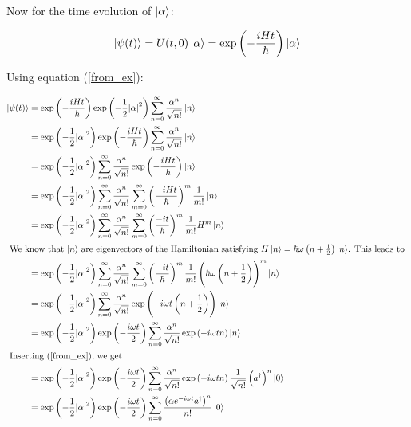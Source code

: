 \documentclass[a4paper,german,12pt,smallheadings]{scrartcl}
\begin{document}
\begin{enumerate}[a)]
    Now for the time evolution of $\ket{\alpha}$:

    \begin{equation*}
      \ket{\psi(t)} = U(t,0) \ket{\alpha} = \exp\del{-\frac{i H t}{\hbar}} \ket{\alpha}
    \end{equation*}

    Using equation (\ref{from_ex}):

    \begin{align*}
      \ket{\psi(t)} &= \exp\del{-\frac{i H t}{\hbar}} \exp\del{-\frac{1}{2} \envert{\alpha}^2} \sum_{n=0}^\infty \frac{\alpha^n}{\sqrt{n!}} \ket{n} \\
      &= \exp\del{-\frac{1}{2}  \envert{\alpha}^2} \exp\del{-\frac{i H t}{\hbar}} \sum_{n=0}^\infty \frac{\alpha^n}{\sqrt{n!}} \ket{n} \\
      &= \exp\del{-\frac{1}{2}  \envert{\alpha}^2}  \sum_{n=0}^\infty \frac{\alpha^n}{\sqrt{n!}} \exp\del{-\frac{i H t}{\hbar}} \ket{n} \\
      &= \exp\del{-\frac{1}{2}  \envert{\alpha}^2}  \sum_{n=0}^\infty \frac{\alpha^n}{\sqrt{n!}} \sum_{m=0}^\infty \del{\frac{-iHt}{\hbar}}^m \frac{1}{m!} \ket{n} \\
      &= \exp\del{-\frac{1}{2}  \envert{\alpha}^2}  \sum_{n=0}^\infty \frac{\alpha^n}{\sqrt{n!}} \sum_{m=0}^\infty \del{\frac{-it}{\hbar}}^m \frac{1}{m!} H^m \ket{n} \\
      \intertext{
        We know that $\ket{n}$ are eigenvectors of the Hamiltonian satisfying $H
        \ket{n} = \hbar \omega \del{n + \frac{1}{2}} \ket{n}$. This leads to
      }
      &= \exp\del{-\frac{1}{2}  \envert{\alpha}^2}  \sum_{n=0}^\infty \frac{\alpha^n}{\sqrt{n!}} \sum_{m=0}^\infty \del{\frac{-it}{\hbar}}^m \frac{1}{m!} \del{\hbar \omega \del{n + \frac{1}{2}}}^m \ket{n} \\
      &= \exp\del{-\frac{1}{2}  \envert{\alpha}^2}  \sum_{n=0}^\infty \frac{\alpha^n}{\sqrt{n!}} \exp\del{-i \omega t \del{n + \frac{1}{2}}}\ket{n} \\
      &= \exp\del{-\frac{1}{2}  \envert{\alpha}^2}  \exp\del{-\frac{i \omega t}{2}} \sum_{n=0}^\infty \frac{\alpha^n}{\sqrt{n!}} \exp\del{-i \omega t n}\ket{n} \\
      \intertext{
        Inserting (\ref{from_ex}), we get
      }
      &= \exp\del{-\frac{1}{2}  \envert{\alpha}^2}  \exp\del{-\frac{i \omega t}{2}} \sum_{n=0}^\infty \frac{\alpha^n}{\sqrt{n!}} \exp\del{-i \omega t n} \frac{1}{\sqrt{n!}} \del{a^\dagger}^n \ket{0} \\
      &= \exp\del{-\frac{1}{2}  \envert{\alpha}^2}  \exp\del{-\frac{i \omega t}{2}} \sum_{n=0}^\infty \frac{\del{\alpha e^{-i \omega t} a^\dagger}^n}{n!} \ket{0} \\

\end{align*}
\end{enumerate}
\end{document}
